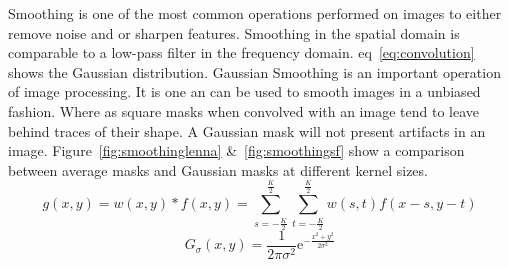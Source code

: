 \documentclass[letterpaper,10pt]{article}
\begin{document}
Smoothing is one of the most common operations performed on images to either remove noise and or sharpen features. Smoothing in the spatial domain is comparable to a low-pass filter in the frequency domain. eq~\ref{eq:convolution} shows the Gaussian distribution. Gaussian Smoothing is an important operation of image processing. It is one an can be used to smooth images in a unbiased fashion. Where as square masks when convolved with an image tend to leave behind traces of their shape. A Gaussian mask will not present artifacts in an image. Figure~\ref{fig:smoothinglenna} \&~\ref{fig:smoothingsf} show a comparison between average masks and Gaussian masks at different kernel sizes.
\begin{equation}
g(x,y)=w(x,y)*f(x,y)=\sum_{s=-\frac{K}{2}}^{\frac{K}{2}}\sum_{t=-\frac{K}{2}}^{\frac{K}{2}}w(s,t)f(x-s,y-t)
\label{eq:convolution}
\end{equation}
\begin{equation}
G_{\sigma}(x,y)=\frac{1}{2\pi \sigma^2}\mathrm{e}^{-\frac{x^2+y^2}{2\sigma^2}}
\label{eq:gaussian}
\end{equation}
\end{document}
